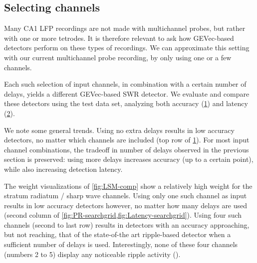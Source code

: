 \subsection{Selecting channels}

Many CA1 LFP recordings are not made with multichannel probes, but rather with one or more tetrodes. It is therefore relevant to ask how GEVec-based detectors perform on these types of recordings. We can approximate this setting with our current multichannel probe recording, by only using one or a few channels.

Each such selection of input channels, in combination with a certain number of delays, yields a different GEVec-based SWR detector. We evaluate and compare these detectors using the test data set, analyzing both accuracy (\cref{fig:PR-searchgrid}) and latency (\cref{fig:Latency-searchgrid}).


\begin{figure}
\label{fig:PR-searchgrid}
\end{figure}

\begin{figure}
\label{fig:Latency-searchgrid}
\end{figure}


We note some general trends. Using no extra delays results in low accuracy detectors, no matter which channels are included (top row of \cref{fig:PR-searchgrid}). For most input channel combinations, the tradeoff in number of delays observed in the previous section is preserved: using more delays increases accuracy (up to a certain point), while also increasing detection latency.

The weight visualizations of \cref{fig:LSM-comp} show a relatively high weight for the stratum radiatum / sharp wave channels. Using only one such channel as input results in low accuracy detectors however, no matter how many delays are used (second column of \cref{fig:PR-searchgrid,fig:Latency-searchgrid}). Using four such channels (second to last row) results in detectors with an accuracy approaching, but not reaching, that of the state-of-the art ripple-based detector when a sufficient number of delays is used. Interestingly, none of these four channels (numbers 2 to 5) display any noticeable ripple activity ().

